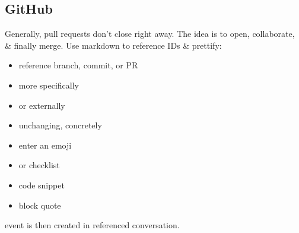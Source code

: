 \subsection*{GitHub}
Generally, pull requests don't close right away.  
The idea is to open, collaborate, \& finally merge. Use markdown to reference IDs \& prettify:
{\scriptsize
\begin{itemize}
    \item {} reference branch, commit, or PR
    \item {} more specifically
    \item {} or externally
    \item {} unchanging, concretely
    \item {} enter an emoji
    \item {} or checklist
    \item {} code snippet
    \item {} block quote
\end{itemize}}

 event is then created in referenced 
conversation.
\ \\